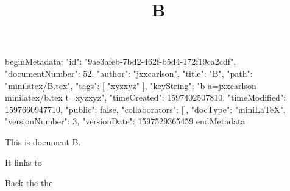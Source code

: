 beginMetadata:
{
    "id": "9ae3afeb-7bd2-462f-b5d4-172f19ca2cdf",
    "documentNumber": 52,
    "author": "jxxcarlson",
    "title": "B",
    "path": "minilatex/B.tex",
    "tags": [
        "xyzxyz"
    ],
    "keyString": "b a=jxxcarlson minilatex/b.tex t=xyzxyz",
    "timeCreated": 1597402507810,
    "timeModified": 1597660947710,
    "public": false,
    "collaborators": [],
    "docType": "miniLaTeX",
    "versionNumber": 3,
    "versionDate": 1597529365459
}
endMetadata
\title{B}

\maketitle

This is document B.

It links to 


Back the the 


